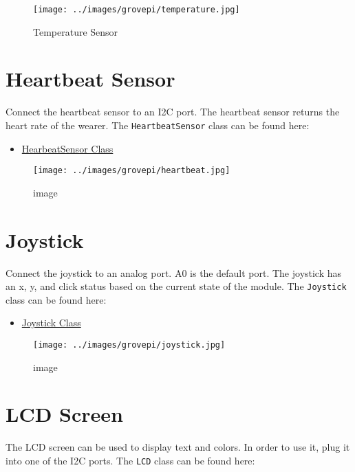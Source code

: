 \begin{figure}
\centering
\texttt{[image: ../images/grovepi/temperature.jpg]}
\caption{Temperature Sensor}
\end{figure}

\section{Heartbeat Sensor}\label{heartbeat-sensor}

Connect the heartbeat sensor to an I2C port. The heartbeat sensor
returns the heart rate of the wearer. The \texttt{HeartbeatSensor} class
can be found here:

\begin{itemize}

\item
  \href{https://github.com/cloudmesh/cloudmesh.pi/blob/master/cloudmesh/pi/heartbeat.py}{HearbeatSensor
  Class}
\end{itemize}

\begin{figure}
\centering
\texttt{[image: ../images/grovepi/heartbeat.jpg]}
\caption{image}
\end{figure}

\section{Joystick}\label{joystick}

Connect the joystick to an analog port. A0 is the default port. The
joystick has an x, y, and click status based on the current state of the
module. The \texttt{Joystick} class can be found here:

\begin{itemize}

\item
  \href{https://github.com/cloudmesh/cloudmesh.pi/blob/master/cloudmesh/pi/joystick.py}{Joystick
  Class}
\end{itemize}

\begin{figure}
\centering
\texttt{[image: ../images/grovepi/joystick.jpg]}
\caption{image}
\end{figure}

\section{LCD Screen}\label{lcd-screen}

The LCD screen can be used to display text and colors. In order to use
it, plug it into one of the I2C ports. The \texttt{LCD} class can be
found here:

